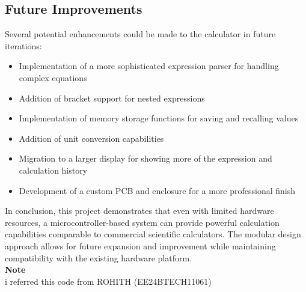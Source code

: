 \documentclass[12pt]{article}
\begin{document}
	\subsection{Future Improvements}
	Several potential enhancements could be made to the calculator in future iterations:
	\begin{itemize}
		\item Implementation of a more sophisticated expression parser for handling complex equations
		\item Addition of bracket support for nested expressions
		\item Implementation of memory storage functions for saving and recalling values
		\item Addition of unit conversion capabilities
		\item Migration to a larger display for showing more of the expression and calculation history
		\item Development of a custom PCB and enclosure for a more professional finish
	\end{itemize}
	
	In conclusion, this project demonstrates that even with limited hardware resources, a microcontroller-based system can provide powerful calculation capabilities comparable to commercial scientific calculators. The modular design approach allows for future expansion and improvement while maintaining compatibility with the existing hardware platform.
	\\
	\textbf{Note}\\i referred this code from ROHITH (EE24BTECH11061)
\end{document}
